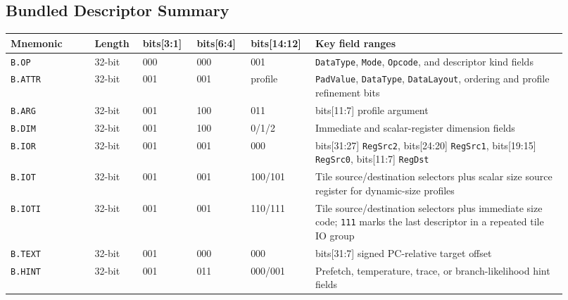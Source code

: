 \subsection{Bundled Descriptor Summary}
\begin{longtable}{@{}L{0.14\linewidth}L{0.08\linewidth}L{0.09\linewidth}L{0.09\linewidth}L{0.10\linewidth}L{0.42\linewidth}@{}}
\toprule
Mnemonic & Length & bits[3:1] & bits[6:4] & bits[14:12] & Key field ranges \\
\midrule
\texttt{B.OP} & 32-bit & 000 & 000 & 001 & \texttt{DataType}, \texttt{Mode}, \texttt{Opcode}, and descriptor kind fields \\
\texttt{B.ATTR} & 32-bit & 001 & 001 & profile & \texttt{PadValue}, \texttt{DataType}, \texttt{DataLayout}, ordering and profile refinement bits \\
\texttt{B.ARG} & 32-bit & 001 & 100 & 011 & bits[11:7] profile argument \\
\texttt{B.DIM} & 32-bit & 001 & 100 & 0/1/2 & Immediate and scalar-register dimension fields \\
\texttt{B.IOR} & 32-bit & 001 & 001 & 000 & bits[31:27] \texttt{RegSrc2}, bits[24:20] \texttt{RegSrc1}, bits[19:15] \texttt{RegSrc0}, bits[11:7] \texttt{RegDst} \\
\texttt{B.IOT} & 32-bit & 001 & 001 & 100/101 & Tile source/destination selectors plus scalar size source register for dynamic-size profiles \\
\texttt{B.IOTI} & 32-bit & 001 & 001 & 110/111 & Tile source/destination selectors plus immediate size code; \texttt{111} marks the last descriptor in a repeated tile IO group \\
\texttt{B.TEXT} & 32-bit & 001 & 000 & 000 & bits[31:7] signed PC-relative target offset \\
\texttt{B.HINT} & 32-bit & 001 & 011 & 000/001 & Prefetch, temperature, trace, or branch-likelihood hint fields \\
\bottomrule
\end{longtable}


\clearpage
